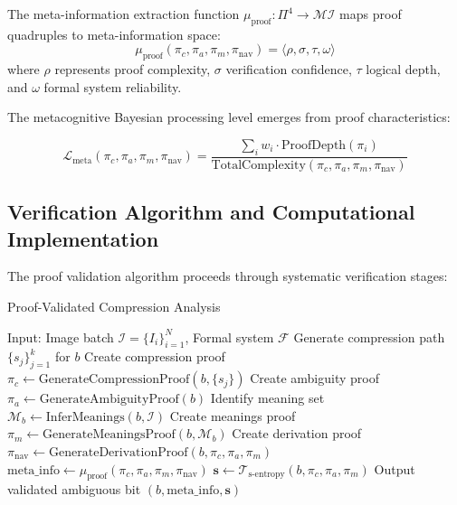 \begin{definition}
The meta-information extraction function $\mu_{\text{proof}}: \Pi^4 \to \mathcal{MI}$ maps proof quadruples to meta-information space:
\begin{equation}
\mu_{\text{proof}}(\pi_c, \pi_a, \pi_m, \pi_{\text{nav}}) = \langle \rho, \sigma, \tau, \omega \rangle
\label{eq:proof-meta-info}
\end{equation}
where $\rho$ represents proof complexity, $\sigma$ verification confidence, $\tau$ logical depth, and $\omega$ formal system reliability.
\end{definition}

The metacognitive Bayesian processing level emerges from proof characteristics:

\begin{equation}
\mathcal{L}_{\text{meta}}(\pi_c, \pi_a, \pi_m, \pi_{\text{nav}}) = \frac{\sum_{i} w_i \cdot \text{ProofDepth}(\pi_i)}{\text{TotalComplexity}(\pi_c, \pi_a, \pi_m, \pi_{\text{nav}})}
\label{eq:metacognitive-level}
\end{equation}

\subsection{Verification Algorithm and Computational Implementation}

The proof validation algorithm proceeds through systematic verification stages:

\begin{algorithm}[H]
\caption{Proof-Validated Compression Analysis}
\begin{algorithmic}[1]
\STATE Input: Image batch $\mathcal{I} = \{I_i\}_{i=1}^N$, Formal system $\mathcal{F}$
    \STATE Generate compression path $\{s_j\}_{j=1}^k$ for $b$
    \STATE Create compression proof $\pi_c \leftarrow \text{GenerateCompressionProof}(b, \{s_j\})$
    \STATE Create ambiguity proof $\pi_a \leftarrow \text{GenerateAmbiguityProof}(b)$
    \STATE Identify meaning set $\mathcal{M}_b \leftarrow \text{InferMeanings}(b, \mathcal{I})$
    \STATE Create meanings proof $\pi_m \leftarrow \text{GenerateMeaningsProof}(b, \mathcal{M}_b)$
    \STATE Create derivation proof $\pi_{\text{nav}} \leftarrow \text{GenerateDerivationProof}(b, \pi_c, \pi_a, \pi_m)$
        \STATE $\text{meta\_info} \leftarrow \mu_{\text{proof}}(\pi_c, \pi_a, \pi_m, \pi_{\text{nav}})$
        \STATE $\mathbf{s} \leftarrow \mathcal{T}_{\text{s-entropy}}(b, \pi_c, \pi_a, \pi_m)$
        \STATE Output validated ambiguous bit $(b, \text{meta\_info}, \mathbf{s})$
    \ENDIF
\ENDFOR
\end{algorithmic}
\end{algorithm}


